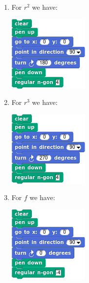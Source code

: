 \documentclass[noauthor,nooutcomes,12pt,hints]{ximera}
\begin{document}
\begin{question}
\begin{freeResponse}
\begin{enumerate}
\begin{center}
      \end{center}
    \item For $r^2$ we have:
      \begin{center}
        \includegraphics[width=.3\textwidth]{r2SqSCRIPT.png}   \qquad {}
      \end{center}
    \item For $r^3$ we have:
      \begin{center}
        \includegraphics[width=.3\textwidth]{r3SqSCRIPT.png}   \qquad {}
      \end{center}
    \item For $f$ we have:
      \begin{center}
        \includegraphics[width=.3\textwidth]{fSqSCRIPT.png}   \qquad {}

\end{center}
\end{enumerate}
\end{freeResponse}
\end{question}
\end{document}
